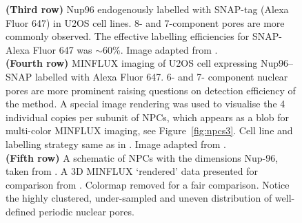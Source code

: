 \documentclass[9pt,twocolumn,twoside]{pnas-new}
\begin{document}
\begin{figure}[h!]
{\textbf{(Third row)} Nup96 endogenously labelled with SNAP-tag (Alexa Fluor 647) in U2OS cell lines. 8- and 7-component pores are more commonly observed. The effective labelling efficiencies for SNAP-Alexa Fluor 647 was $\sim$60\%. Image adapted from \cite{thevathasan2019nuclear}. \\
\textbf{(Fourth row)} MINFLUX imaging of U2OS cell expressing Nup96–SNAP labelled with Alexa Fluor 647. 
6- and 7- component nuclear pores are more prominent raising questions on detection efficiency of the method. A special image rendering was used to visualise the 4 individual copies per subunit of NPCs, which appears as a blob for multi-color MINFLUX imaging, see Figure~\ref{fig:npcs3}. Cell line and labelling strategy same as in  \cite{thevathasan2019nuclear}. Image adapted from  \cite{gwosch2020minflux}. \\
\textbf{(Fifth row)} A schematic of NPCs with the dimensions Nup-96, taken from \cite{thevathasan2019nuclear}.  A 3D MINFLUX `rendered' data presented for comparison from \cite{gwosch2020minflux}. Colormap removed for a fair comparison. Notice the highly clustered, under-sampled and uneven distribution of well-defined periodic nuclear pores. } \label{fig:npcs2}
\end{figure}
\end{document}
